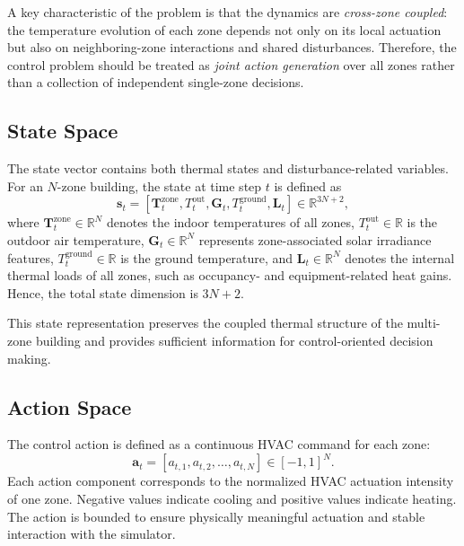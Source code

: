 \documentclass[lettersize,journal]{IEEEtran}
\theoremstyle{nonumberplain}     \theoremheaderfont{\bfseries\itshape}     \theorembodyfont{\normalfont}     \theoremseparator{:}     \theoremsymbol{\ensuremath{\blacksquare}}     \newtheorem{proof}{Proof}
\theoremstyle{plain}     \theoremheaderfont{\bfseries\itshape}     \theorembodyfont{\normalfont}     \theoremseparator{:}     \theoremsymbol{\ensuremath{\blacksquare}}     \newtheorem{remark}{Remark}
\begin{document}
A key characteristic of the problem is that the dynamics are \emph{cross-zone coupled}: the temperature evolution of each zone depends not only on its local actuation but also on neighboring-zone interactions and shared disturbances. Therefore, the control problem should be treated as \emph{joint action generation} over all zones rather than a collection of independent single-zone decisions.

\subsection{State Space}
The state vector contains both thermal states and disturbance-related variables. For an $N$-zone building, the state at time step $t$ is defined as
\begin{equation}
    \mathbf{s}_t =
    \left[
    \mathbf{T}_t^{\mathrm{zone}},
    T_t^{\mathrm{out}},
    \mathbf{G}_t,
    T_t^{\mathrm{ground}},
    \mathbf{L}_t
    \right]
    \in \mathbb{R}^{3N+2},
    \label{eq:state}
\end{equation}
where $\mathbf{T}_t^{\mathrm{zone}} \in \mathbb{R}^N$ denotes the indoor temperatures of all zones, $T_t^{\mathrm{out}} \in \mathbb{R}$ is the outdoor air temperature, $\mathbf{G}_t \in \mathbb{R}^N$ represents zone-associated solar irradiance features, $T_t^{\mathrm{ground}} \in \mathbb{R}$ is the ground temperature, and $\mathbf{L}_t \in \mathbb{R}^N$ denotes the internal thermal loads of all zones, such as occupancy- and equipment-related heat gains. Hence, the total state dimension is $3N+2$.

This state representation preserves the coupled thermal structure of the multi-zone building and provides sufficient information for control-oriented decision making.

\subsection{Action Space}
The control action is defined as a continuous HVAC command for each zone:
\begin{equation}
    \mathbf{a}_t =
    [a_{t,1}, a_{t,2}, \dots, a_{t,N}]
    \in [-1,1]^N.
    \label{eq:action}
\end{equation}
Each action component corresponds to the normalized HVAC actuation intensity of one zone. Negative values indicate cooling and positive values indicate heating. The action is bounded to ensure physically meaningful actuation and stable interaction with the simulator.
\end{document}
